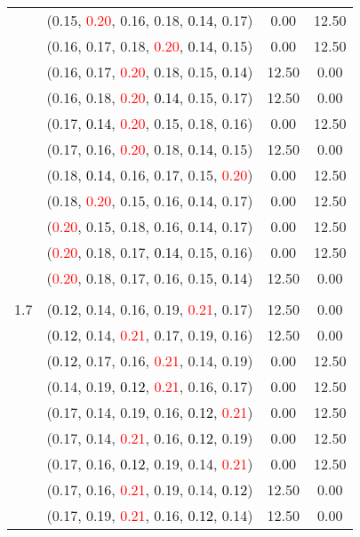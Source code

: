 \documentclass[10pt,a4paper]{report}
\begin{document}
\begin{center}
\begin{longtable}{clcc}
			&(0.15, \textcolor{red}{0.20}, 0.16, 0.18, \textcolor{black}{0.14}, 0.17)&0.00&12.50\\
			&(0.16, 0.17, 0.18, \textcolor{red}{0.20}, \textcolor{black}{0.14}, 0.15)&0.00&12.50\\
			&(0.16, 0.17, \textcolor{red}{0.20}, 0.18, 0.15, \textcolor{black}{0.14})&12.50&0.00\\
			&(0.16, 0.18, \textcolor{red}{0.20}, \textcolor{black}{0.14}, 0.15, 0.17)&12.50&0.00\\
			&(0.17, \textcolor{black}{0.14}, \textcolor{red}{0.20}, 0.15, 0.18, 0.16)&0.00&12.50\\
			&(0.17, 0.16, \textcolor{red}{0.20}, 0.18, \textcolor{black}{0.14}, 0.15)&12.50&0.00\\
			&(0.18, \textcolor{black}{0.14}, 0.16, 0.17, 0.15, \textcolor{red}{0.20})&0.00&12.50\\
			&(0.18, \textcolor{red}{0.20}, 0.15, 0.16, \textcolor{black}{0.14}, 0.17)&0.00&12.50\\
			&(\textcolor{red}{0.20}, 0.15, 0.18, 0.16, \textcolor{black}{0.14}, 0.17)&0.00&12.50\\
			&(\textcolor{red}{0.20}, 0.18, 0.17, \textcolor{black}{0.14}, 0.15, 0.16)&0.00&12.50\\
			&(\textcolor{red}{0.20}, 0.18, 0.17, 0.16, 0.15, \textcolor{black}{0.14})&12.50&0.00\\
		&&&\\
		1.7			&(\textcolor{black}{0.12}, 0.14, 0.16, 0.19, \textcolor{red}{0.21}, 0.17)&12.50&0.00\\
			&(\textcolor{black}{0.12}, 0.14, \textcolor{red}{0.21}, 0.17, 0.19, 0.16)&12.50&0.00\\
			&(\textcolor{black}{0.12}, 0.17, 0.16, \textcolor{red}{0.21}, 0.14, 0.19)&0.00&12.50\\
			&(0.14, 0.19, \textcolor{black}{0.12}, \textcolor{red}{0.21}, 0.16, 0.17)&0.00&12.50\\
			&(0.17, 0.14, 0.19, 0.16, \textcolor{black}{0.12}, \textcolor{red}{0.21})&0.00&12.50\\
			&(0.17, 0.14, \textcolor{red}{0.21}, 0.16, \textcolor{black}{0.12}, 0.19)&0.00&12.50\\
			&(0.17, 0.16, \textcolor{black}{0.12}, 0.19, 0.14, \textcolor{red}{0.21})&0.00&12.50\\
			&(0.17, 0.16, \textcolor{red}{0.21}, 0.19, 0.14, \textcolor{black}{0.12})&12.50&0.00\\
			&(0.17, 0.19, \textcolor{red}{0.21}, 0.16, \textcolor{black}{0.12}, 0.14)&12.50&0.00\\

\end{longtable}
\end{center}
\end{document}

